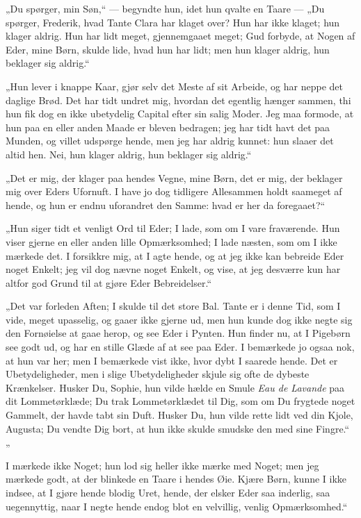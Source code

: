 \documentclass[12pt,a4paper]{book}
\newcommand{\apage}[1]{\marginnote{\footnotesize\textit{[#1]}}}
\begin{document}
„Du spørger, min Søn,“ — begyndte hun, idet hun qvalte en Taare — „Du spørger, Frederik, hvad Tante Clara har klaget over? Hun har ikke klaget; hun klager aldrig. Hun har lidt meget, gjennemgaaet meget; Gud forbyde, at \apage{75}
Nogen af Eder, mine Børn, skulde lide, hvad hun har lidt; men hun klager aldrig, hun beklager sig aldrig.“

„Hun lever i knappe Kaar, gjør selv det Meste af sit Arbeide, og har neppe det daglige Brød. Det har tidt undret mig, hvordan det egentlig hænger sammen, thi hun fik dog en ikke ubetydelig Capital efter sin salig Moder. Jeg maa formode, at hun paa en eller anden Maade er bleven bedragen; jeg har tidt havt det paa Munden, og villet udspørge hende, men jeg har aldrig kunnet: hun slaaer det altid hen. Nei, hun klager aldrig, hun beklager sig aldrig.“

„Det er mig, der klager paa hendes Vegne, mine Børn, det er mig, der beklager mig over Eders Ufornuft. I have jo dog tidligere Allesammen holdt saameget af hende, og hun er endnu uforandret den Samme: hvad er her da foregaaet?“

„Hun siger tidt et venligt Ord til Eder; I lade, som om I vare fraværende. Hun viser gjerne en eller anden lille Opmærksomhed; I lade næsten, som om I ikke mærkede det. I forsikkre mig, at I agte hende, og at jeg ikke kan bebreide Eder noget Enkelt; jeg vil dog nævne noget Enkelt, og vise, at jeg desværre kun har altfor god Grund til at gjøre Eder Bebreidelser.“

„Det var forleden Aften; I skulde til det store Bal. Tante er i denne Tid, som I vide, meget upasselig, og gaaer ikke gjerne ud, men hun kunde dog ikke negte sig den Fornøielse at gaae herop, og see Eder i Pynten. Hun finder nu, at I Pigebørn see godt ud, og har en stille Glæde af at see paa Eder. I bemærkede jo ogsaa nok, at hun var her; men I bemærkede vist ikke, hvor dybt I saarede hende. Det er Ubetydeligheder, men i slige Ubetydeligheder skjule sig ofte de dybeste Krænkelser. Husker Du, Sophie, hun vilde hælde en Smule \textit{Eau de Lavande} paa dit Lommetørklæde; Du trak Lommetørklædet til Dig, som om Du frygtede noget Gammelt, der havde tabt sin Duft. Husker Du, hun vilde rette lidt ved din Kjole, Augusta; Du vendte Dig bort, at hun ikke skulde smudske den med sine Fingre.“
 \apage{76}
„

I mærkede ikke Noget; hun lod sig heller ikke mærke med Noget; men jeg mærkede godt, at der blinkede en Taare i hendes Øie. Kjære Børn, kunne I ikke indsee, at I gjøre hende blodig Uret, hende, der elsker Eder saa inderlig, saa uegennyttig, naar I negte hende endog blot en velvillig, venlig Opmærksomhed.“
\end{document}
